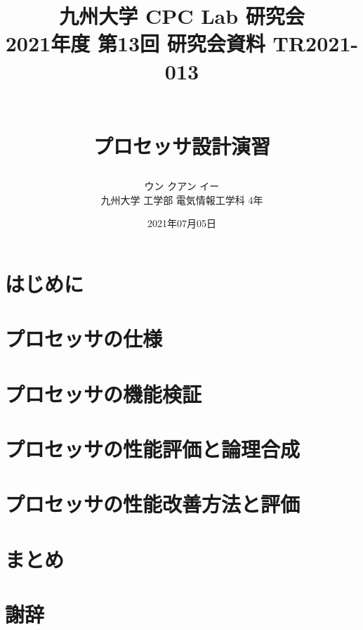 \documentclass[a4paper, 10pt]{jarticle}
\title{
  \begin{flushright}
    \normalsize{
      九州大学 CPC Lab 研究会  \\
      2021年度 第13回 研究会資料 TR2021-013
    }
  \end{flushright}
  \Large{\textbf{\\プロセッサ設計演習}}
}
\author{
    ウン クアン イー\\
    九州大学 工学部 電気情報工学科 4年
}
\date{2021年07月05日}
\begin{document}
  \begin{twocolumn}

  \maketitle

  \section{はじめに} \label{section:introduction}
  

  \section{プロセッサの仕様} \label{section:specifications}
  

  \section{プロセッサの機能検証} \label{section:testing}
  

  \section{プロセッサの性能評価と論理合成} \label{section:evaluation}
  

  \section{プロセッサの性能改善方法と評価} \label{section:improvements}
  

  \section{まとめ} \label{section:summary}
  

  \section*{謝辞}
  

  
  

  \begin{appendices} \label{section:appendix}
    
  \end{appendices}

\end{twocolumn}
\end{document}
